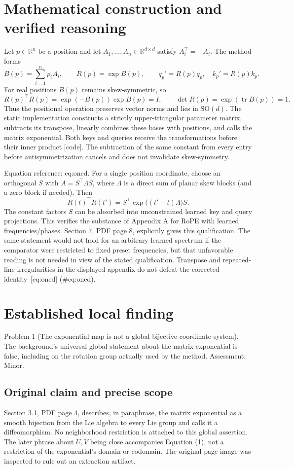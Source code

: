\documentclass[10pt]{article}
\begin{document}
\section*{Mathematical construction and verified reasoning}
Let \(p\in\mathbb R^n\) be a position and let \(A_1,\ldots,A_n\in\mathbb R^{d\times d}\) satisfy \(A_i^\top=-A_i\). The method forms \[B(p)=\sum_{i=1}^{n}p_iA_i,\qquad R(p)=\exp B(p),
 \qquad q_p'=R(p)q_p,\quad k_p'=R(p)k_p.\] For real positions \(B(p)\) remains skew-symmetric, so \[R(p)^\top R(p)=\exp(-B(p))\exp B(p)=I,\qquad
 \det R(p)=\exp(\operatorname{tr}B(p))=1.\] Thus the positional operation preserves vector norms and lies in \(\mathrm{SO}(d)\). The static implementation constructs a strictly upper-triangular parameter matrix, subtracts its transpose, linearly combines these bases with positions, and calls the matrix exponential. Both keys and queries receive the transformations before their inner product [code]. The subtraction of the same constant from every entry before antisymmetrization cancels and does not invalidate skew-symmetry.\par
Equation reference: eq:oned. For a single position coordinate, choose an orthogonal \(S\) with \(A=S^\top\Lambda S\), where \(\Lambda\) is a direct sum of planar skew blocks (and a zero block if needed). Then \[
 R(t)^\top R(t')=S^\top\exp\big((t'-t)\Lambda\big)S.\] The constant factors \(S\) can be absorbed into unconstrained learned key and query projections. This verifies the substance of Appendix A for RoPE with learned frequencies/phases. Section 7, PDF page 8, explicitly gives this qualification. The same statement would not hold for an arbitrary learned spectrum if the comparator were restricted to fixed preset frequencies, but that unfavorable reading is not needed in view of the stated qualification. Transpose and repeated-line irregularities in the displayed appendix do not defeat the corrected identity [eq:oned] (\#eq:oned).\par
\section*{Established local finding}
Problem 1 (The exponential map is not a global bijective coordinate system).  The background’s universal global statement about the matrix exponential is false, including on the rotation group actually used by the method. Assessment: Minor.\par
\subsection*{Original claim and precise scope}
Section 3.1, PDF page 4, describes, in paraphrase, the matrix exponential as a smooth bijection from the Lie algebra to every Lie group and calls it a diffeomorphism. No neighborhood restriction is attached to this global assertion. The later phrase about \(U,V\) being close accompanies Equation (1), not a restriction of the exponential’s domain or codomain. The original page image was inspected to rule out an extraction artifact.\par
\end{document}
